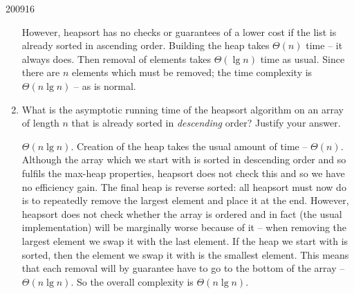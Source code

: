 \documentclass[10pt,\jkfside,a4paper]{article}
\begin{document}
\begin{examquestion}{2009}{1}{6}
\begin{enumerate}[label=(\alph*)]
However, heapsort has no checks or guarantees of a lower cost if the list is already sorted in 
ascending order. Building the heap takes $\Theta(n)$ time -- it always does. Then removal of elements takes 
$\Theta(\lg n)$ time as usual. Since there are $n$ elements which must be removed; the time 
complexity is $\Theta(n \lg n)$ -- as is normal.

\item What is the asymptotic running time of the heapsort algorithm on an array of
length $n$ that is already sorted in \textit{descending} order? Justify your answer.

$\Theta(n \lg n)$. Creation of the heap takes the usual amount of time -- $\Theta(n)$. Although the array which 
we start with is sorted in descending order and so fulfils the max-heap properties, heapsort does not check 
this and so we have no efficiency gain. The final heap is reverse sorted: all heapsort must now do is to repeatedly 
remove the largest element and place it at the end. However, heapsort does not check whether the array is 
ordered and in fact (the usual implementation) will be marginally worse because of it -- when removing the largest 
element we swap it with the last element. If the heap we start with is sorted, then the element we swap it with is 
the smallest element. This means that each removal will by guarantee have to go to the bottom of the array -- 
$\Theta(n \lg n)$. So the overall complexity is $\Theta(n \lg n)$.

\end{enumerate}

\end{examquestion}
\end{document}
